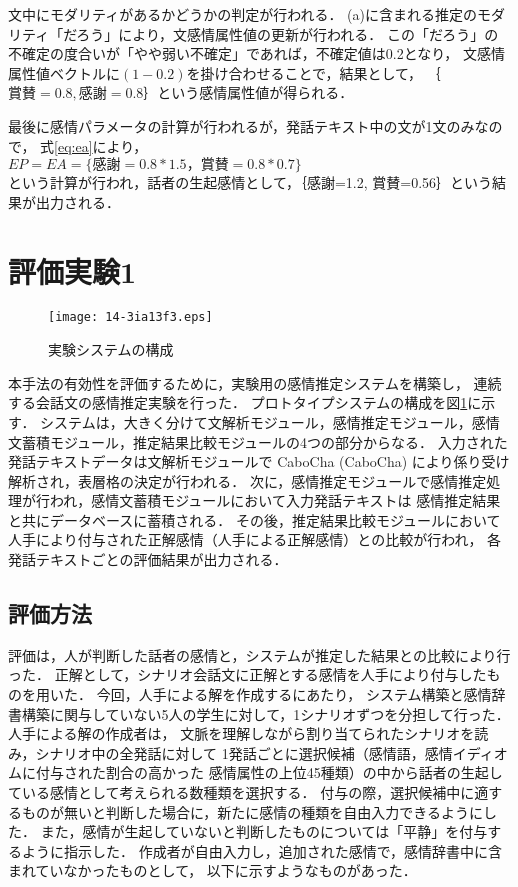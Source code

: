 \documentclass[japanese]{jnlp_1.3c}
\begin{document}
文中にモダリティがあるかどうかの判定が行われる．
(a)に含まれる推定のモダリティ「だろう」により，文感情属性値の更新が行われる．
この「だろう」の不確定の度合いが「やや弱い不確定」であれば，不確定値は0.2となり，
文感情属性値ベクトルに$(1-0.2)$を掛け合わせることで，結果として，
｛$賞賛=0.8, 感謝=0.8$｝という感情属性値が得られる．

最後に感情パラメータの計算が行われるが，発話テキスト中の文が1文のみなので，
式\ref{eq:ea}により，
\\
$EP = EA = \{感謝 = 0.8 * 1.5 ，賞賛 = 0.8 * 0.7\} $
\\
という計算が行われ，話者の生起感情として，｛感謝=1.2, 賞賛=0.56｝という結果が出力される．



\section{評価実験1}

\begin{figure}[b]
\begin{center}
    \texttt{[image: 14-3ia13f3.eps]}
\caption{実験システムの構成}
\label{fig:structure}
\end{center}
\end{figure}

本手法の有効性を評価するために，実験用の感情推定システムを構築し，
連続する会話文の感情推定実験を行った．
プロトタイプシステムの構成を図\ref{fig:structure}に示す．
システムは，大きく分けて文解析モジュール，感情推定モジュール，感情文蓄積モジュール，推定結果比較モジュールの4つの部分からなる．
    入力された発話テキストデータは文解析モジュールで CaboCha (CaboCha) 
により係り受け解析され，表層格の決定が行われる．
次に，感情推定モジュールで感情推定処理が行われ，感情文蓄積モジュールにおいて入力発話テキストは
感情推定結果と共にデータベースに蓄積される．
その後，推定結果比較モジュールにおいて人手により付与された正解感情（人手による正解感情）との比較が行われ，
各発話テキストごとの評価結果が出力される．

\subsection{評価方法}

評価は，人が判断した話者の感情と，システムが推定した結果との比較により行った．
正解として，シナリオ会話文に正解とする感情を人手により付与したものを用いた．
今回，人手による解を作成するにあたり，
システム構築と感情辞書構築に関与していない5人の学生に対して，1シナリオずつを分担して行った．
人手による解の作成者は，
文脈を理解しながら割り当てられたシナリオを読み，シナリオ中の全発話に対して
1発話ごとに選択候補（感情語，感情イディオムに付与された割合の高かった
感情属性の上位45種類）の中から話者の生起している感情として考えられる数種類を選択する．
付与の際，選択候補中に適するものが無いと判断した場合に，新たに感情の種類を自由入力できるようにした．
また，感情が生起していないと判断したものについては「平静」を付与するように指示した．
作成者が自由入力し，追加された感情で，感情辞書中に含まれていなかったものとして，
以下に示すようなものがあった．
\end{document}
